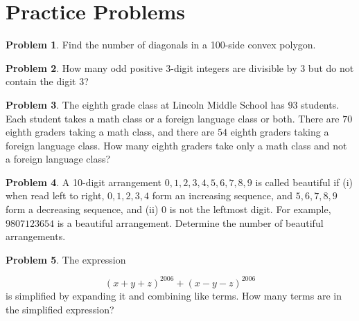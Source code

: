 \documentclass[addpoints]{exam}
\theoremstyle{definition}
\newtheorem{prob}{Problem}[section]
\begin{document}
\section{Practice Problems}
\begin{prob}
	Find the number of diagonals in a 100-side convex polygon.	
\end{prob}
\begin{prob}
	\item How many odd positive $3$-digit integers are divisible by $3$ but do not contain the digit $3$?
\end{prob}
\begin{prob}
	The eighth grade class at Lincoln Middle School has $93$ students. Each student takes a math class or a foreign language class or both. There are $70$ eighth graders taking a math class, and there are $54$ eighth graders taking a foreign language class. How many eighth graders take only a math class and not a foreign language class?
\end{prob}
\begin{prob}
	A 10-digit arrangement $0,1,2,3,4,5,6,7,8,9$ is called beautiful if (i) when read left to right, $0,1,2,3,4$ form an increasing sequence, and $5,6,7,8,9$ form a decreasing sequence, and (ii) $0$ is not the leftmost digit. For example, $9807123654$ is a beautiful arrangement. Determine the number of beautiful arrangements.
\end{prob}
\begin{prob}
	 The expression

\[(x+y+z)^{2006}+(x-y-z)^{2006}\]
is simplified by expanding it and combining like terms. How many terms are in the simplified expression?
\end{prob}
\end{document}
